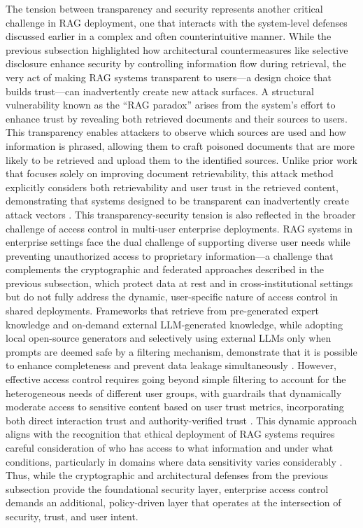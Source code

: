 \documentclass[11pt]{article}
\begin{document}
The tension between transparency and security represents another critical challenge in RAG deployment, one that interacts with the system-level defenses discussed earlier in a complex and often counterintuitive manner. While the previous subsection highlighted how architectural countermeasures like selective disclosure enhance security by controlling information flow during retrieval, the very act of making RAG systems transparent to users---a design choice that builds trust---can inadvertently create new attack surfaces. A structural vulnerability known as the ``RAG paradox'' arises from the system's effort to enhance trust by revealing both retrieved documents and their sources to users. This transparency enables attackers to observe which sources are used and how information is phrased, allowing them to craft poisoned documents that are more likely to be retrieved and upload them to the identified sources. Unlike prior work that focuses solely on improving document retrievability, this attack method explicitly considers both retrievability and user trust in the retrieved content, demonstrating that systems designed to be transparent can inadvertently create attack vectors \cite{ref504}. This transparency-security tension is also reflected in the broader challenge of access control in multi-user enterprise deployments. RAG systems in enterprise settings face the dual challenge of supporting diverse user needs while preventing unauthorized access to proprietary information---a challenge that complements the cryptographic and federated approaches described in the previous subsection, which protect data at rest and in cross-institutional settings but do not fully address the dynamic, user-specific nature of access control in shared deployments. Frameworks that retrieve from pre-generated expert knowledge and on-demand external LLM-generated knowledge, while adopting local open-source generators and selectively using external LLMs only when prompts are deemed safe by a filtering mechanism, demonstrate that it is possible to enhance completeness and prevent data leakage simultaneously \cite{ref505}. However, effective access control requires going beyond simple filtering to account for the heterogeneous needs of different user groups, with guardrails that dynamically moderate access to sensitive content based on user trust metrics, incorporating both direct interaction trust and authority-verified trust \cite{ref503}. This dynamic approach aligns with the recognition that ethical deployment of RAG systems requires careful consideration of who has access to what information and under what conditions, particularly in domains where data sensitivity varies considerably \cite{ref506}. Thus, while the cryptographic and architectural defenses from the previous subsection provide the foundational security layer, enterprise access control demands an additional, policy-driven layer that operates at the intersection of security, trust, and user intent.
\end{document}
